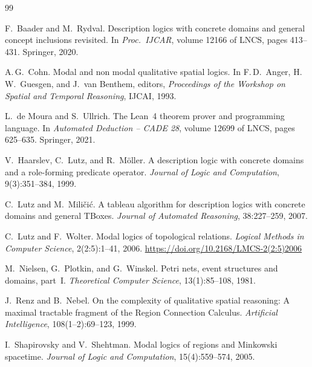 \documentclass[11pt]{article}
\theoremstyle{plain}
\theoremstyle{definition}
\begin{document}
\begin{thebibliography}{99}

F.\ Baader and M.\ Rydval.
\newblock Description logics with concrete domains and general concept
  inclusions revisited.
\newblock In \emph{Proc.\ IJCAR}, volume 12166 of LNCS, pages 413--431.
  Springer, 2020.

A.\,G.\ Cohn.
\newblock Modal and non modal qualitative spatial logics.
\newblock In F.\,D.\ Anger, H.\,W.\ Guesgen, and J.\ van Benthem, editors,
  \emph{Proceedings of the Workshop on Spatial and Temporal Reasoning},
  IJCAI, 1993.

L.\ de Moura and S.\ Ullrich.
\newblock The Lean~4 theorem prover and programming language.
\newblock In \emph{Automated Deduction -- CADE 28}, volume 12699 of LNCS,
  pages 625--635. Springer, 2021.

V.\ Haarslev, C.\ Lutz, and R.\ M\"oller.
\newblock A description logic with concrete domains and a role-forming
  predicate operator.
\newblock \emph{Journal of Logic and Computation}, 9(3):351--384, 1999.

C.\ Lutz and M.\ Mili\v{c}i\'{c}.
\newblock A tableau algorithm for description logics with concrete domains and
  general TBoxes.
\newblock \emph{Journal of Automated Reasoning}, 38:227--259, 2007.

C.\ Lutz and F.\ Wolter.
\newblock Modal logics of topological relations.
\newblock \emph{Logical Methods in Computer Science}, 2(2:5):1--41, 2006.
\newblock \url{https://doi.org/10.2168/LMCS-2(2:5)2006}

M.\ Nielsen, G.\ Plotkin, and G.\ Winskel.
\newblock Petri nets, event structures and domains, part~I.
\newblock \emph{Theoretical Computer Science}, 13(1):85--108, 1981.

J.\ Renz and B.\ Nebel.
\newblock On the complexity of qualitative spatial reasoning:
  A maximal tractable fragment of the Region Connection Calculus.
\newblock \emph{Artificial Intelligence}, 108(1--2):69--123, 1999.

I.\ Shapirovsky and V.\ Shehtman.
\newblock Modal logics of regions and Minkowski spacetime.
\newblock \emph{Journal of Logic and Computation}, 15(4):559--574, 2005.


\end{thebibliography}
\end{document}
